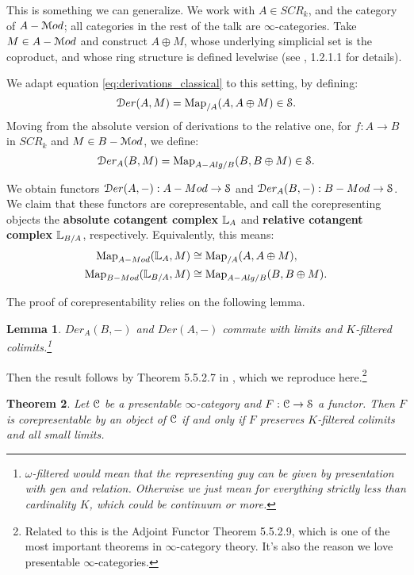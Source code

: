 \documentclass[10pt,a4paper,reqno,oneside]{book} %
\theoremstyle{plain}
\newtheorem{thm}{Theorem}[section]
\newtheorem{lem}[thm]{Lemma}
\theoremstyle{definition}
\theoremstyle{remark}
\numberwithin{equation}{section}
\begin{document}
This is something we can generalize. We work with $A \in SCR_k$, and the category of $A-\mathcal M od$; all categories in the rest of
the talk are $\infty$-categories. Take $M \in A-\mathcal M od$ and construct $A \oplus M$, whose underlying simplicial set is the
coproduct, and whose ring structure is defined levelwise (see \cite{HAG-II}, 1.2.1.1 for details).

We adapt equation \ref{eq:derivations_classical} to this setting, by defining:
\[	\mathcal D er(A,M) = \operatorname{Map}_{/A}(A,A\oplus M) \in \mathcal S.	\]
Moving from the absolute version of derivations to the relative one, for $f : A \to B$ in $SCR_k$ and $M \in B-\mathcal M od$, we 
define: 
\[	\mathcal D er_A (B,M) = \operatorname{Map}_{A-Alg/B}(B, B\oplus M)\in \mathcal S.	\]


We obtain functors $\mathcal D er(A,-) : A-Mod \to \mathcal S$ and $\mathcal D er_A(B,-) : B-Mod \to \mathcal S$. We claim that these functors are corepresentable,
and call the corepresenting objects the \textbf{absolute cotangent complex} $\mathbb L_A$ and \textbf{relative cotangent complex}
$\mathbb L_{B/A}$, respectively. Equivalently, this means:
\begin{align*}
\operatorname{Map}_{A-Mod}(\mathbb L_{A}, M) &\cong \operatorname{Map}_{/A}(A, A\oplus M), \\
\operatorname{Map}_{B-Mod}(\mathbb L_{B/A}, M) &\cong \operatorname{Map}_{A-Alg/B}(B, B\oplus M).
\end{align*}

The proof of corepresentability relies on the following lemma.
\begin{lem}
\item $Der_A(B,-)$ and $Der(A,-)$ commute with limits and $K$-filtered colimits.\footnote{
$\omega$-filtered would mean that the representing guy can be given by presentation with gen and relation. Otherwise we just
mean for everything strictly less than cardinality $K$, which could be continuum or more.} 
\end{lem}

Then the result follows by Theorem 5.5.2.7 in \cite{HTT}, which we reproduce here.\footnote{Related to this is the Adjoint
Functor Theorem 5.5.2.9, which is one of the most important theorems in $\infty$-category theory. It's also the reason
we love presentable $\infty$-categories.}

\begin{thm}
Let $\mathcal C$ be a presentable $\infty$-category and $F : \mathcal C \to \mathcal S$ a functor. Then $F$ is corepresentable by an object of
$\mathcal C$ if and only if $F$ preserves $K$-filtered colimits and all small limits.
\end{thm}
\end{document}
